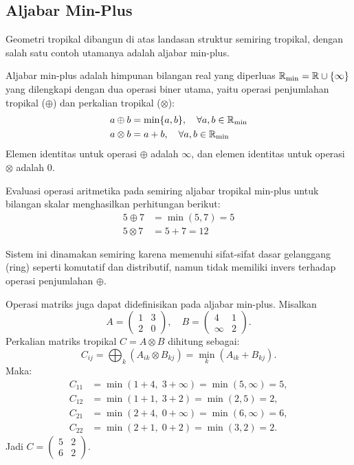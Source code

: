 \subsection{Aljabar Min-Plus}
Geometri tropikal dibangun di atas landasan struktur semiring tropikal, dengan salah satu contoh utamanya adalah aljabar min-plus.
\begin{definisi}
  Aljabar min-plus adalah himpunan bilangan real yang diperluas $\mathbb{R}_{\min} = \mathbb{R} \cup \{\infty\}$ yang dilengkapi dengan dua operasi biner utama, yaitu operasi penjumlahan tropikal ($\oplus$) dan perkalian tropikal ($\otimes$):
  \begin{align*}
    a \oplus b  & = \min\{a, b\}, \quad \forall a, b \in \mathbb{R}_{\min} \\
    a \otimes b & = a + b, \quad \forall a, b \in \mathbb{R}_{\min}
  \end{align*}
  Elemen identitas untuk operasi $\oplus$ adalah $\infty$, dan elemen identitas untuk operasi $\otimes$ adalah $0$.
\end{definisi}

\begin{contoh}
  Evaluasi operasi aritmetika pada semiring aljabar tropikal min-plus untuk bilangan skalar menghasilkan perhitungan berikut:
  \begin{align*}
    5 \oplus 7  & = \min(5, 7) = 5 \\
    5 \otimes 7 & = 5 + 7 = 12
  \end{align*}
\end{contoh}

Sistem ini dinamakan semiring karena memenuhi sifat-sifat dasar gelanggang (ring) seperti komutatif dan distributif, namun tidak memiliki invers terhadap operasi penjumlahan $\oplus$.

\begin{contoh}
  Operasi matriks juga dapat didefinisikan pada aljabar min-plus. Misalkan
  \[
    A = \begin{pmatrix} 1 & 3 \\ 2 & 0 \end{pmatrix}, \quad B = \begin{pmatrix} 4 & 1 \\ \infty & 2 \end{pmatrix}.
  \]
  Perkalian matriks tropikal $C = A \otimes B$ dihitung sebagai:
  \[
    C_{ij} = \bigoplus_{k} (A_{ik} \otimes B_{kj}) = \min_k (A_{ik} + B_{kj}).
  \]
  Maka:
  \begin{align*}
    C_{11} &= \min(1+4,\; 3+\infty) = \min(5, \infty) = 5, \\
    C_{12} &= \min(1+1,\; 3+2) = \min(2, 5) = 2, \\
    C_{21} &= \min(2+4,\; 0+\infty) = \min(6, \infty) = 6, \\
    C_{22} &= \min(2+1,\; 0+2) = \min(3, 2) = 2.
  \end{align*}
  Jadi $C = \begin{pmatrix} 5 & 2 \\ 6 & 2 \end{pmatrix}$.
\end{contoh}

